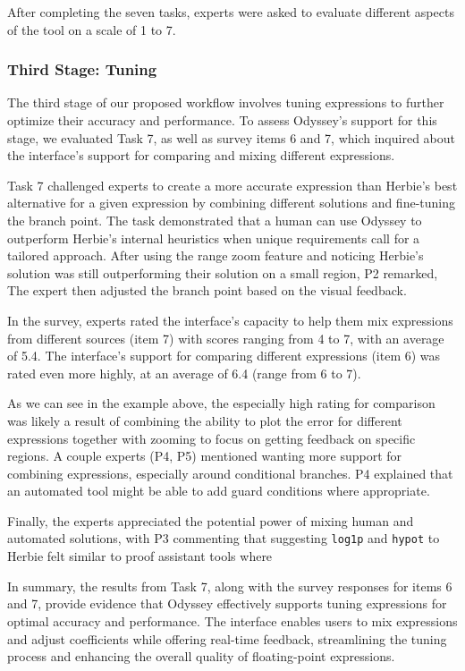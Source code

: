 \begin{table*}
  \centering
  
  \caption {After completing the seven tasks, experts were asked to evaluate
 different aspects of the tool on a scale of 1 to 7. }
  \label{fig:survey-results}
\end{table*}

\subsubsection*{Third Stage: Tuning}

The third stage of our proposed workflow involves tuning expressions to further
optimize their accuracy and performance. To assess Odyssey's support for this
stage, we evaluated Task 7, as well as survey items 6 and 7, which inquired about
the interface's support for comparing and mixing different expressions.

Task 7 challenged experts to create a more accurate expression than
Herbie's best alternative for a given expression by combining different
solutions and fine-tuning the branch point. The task demonstrated that a human
can use Odyssey to outperform Herbie's internal heuristics when unique
requirements call for a tailored approach. 
After using the range zoom feature and noticing 
  Herbie's solution was still outperforming their solution 
  on a small region,
  P2 remarked, 
The expert then adjusted the branch point 
  based on the visual feedback.

In the survey, experts rated the interface's capacity to help them mix expressions from different sources (item 7) with
scores ranging from 4 to 7, with an average of 5.4. The interface's support for
comparing different expressions (item 6) was rated even more highly, at an
average of 6.4 (range from 6 to 7).

As we can see in the example above, 
  the especially high rating for comparison
  was likely a result of combining the ability 
  to plot the error for different expressions
  together with zooming to focus on getting feedback on specific regions.
A couple experts (P4, P5)
  mentioned wanting more support for combining expressions, 
  especially around conditional branches.
P4 explained that 
  an automated tool might be able to add guard conditions 
  where appropriate.

Finally, the experts appreciated the potential power 
  of mixing human and automated solutions, 
  with P3 commenting that 
  suggesting \texttt{log1p} and \texttt{hypot} to Herbie 
  felt similar to proof assistant tools where 

In summary, the results from Task 7, along with the survey responses for items 6
and 7, provide evidence that Odyssey effectively supports tuning expressions for optimal accuracy and
performance. The interface enables users to mix expressions
and adjust coefficients while offering real-time feedback, streamlining the
tuning process and enhancing the overall quality of floating-point expressions.
